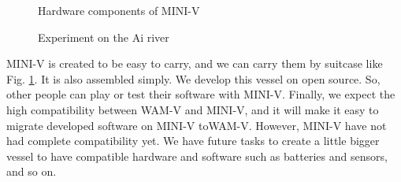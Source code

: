 \documentclass[lettersize,journal]{IEEEtran}
\begin{document}
\begin{figure}[h]
    \begin{center}
  \end{center}
  \caption{Hardware components of MINI-V}
  \label{fig:mini_v_component}
\end{figure}

\begin{figure}[h]
    \begin{center}
    \end{center}
    \caption{Experiment on the Ai river}
    \label{fig:mini_v_experiment}
  \end{figure}

MINI-V is created to be easy to carry, and we can carry them by suitcase like Fig. \ref{fig:mini_v_component}.
It is also assembled simply. We develop this vessel on open source. So, other people can play or test their software with MINI-V. Finally,
we expect the high compatibility between WAM-V and MINI-V, and it will make it easy to migrate developed software on MINI-V toWAM-V. However, 
MINI-V have not had complete compatibility yet.
We have future tasks to create a little bigger vessel to have compatible hardware and software such as batteries and sensors, and so on.
\end{document}
